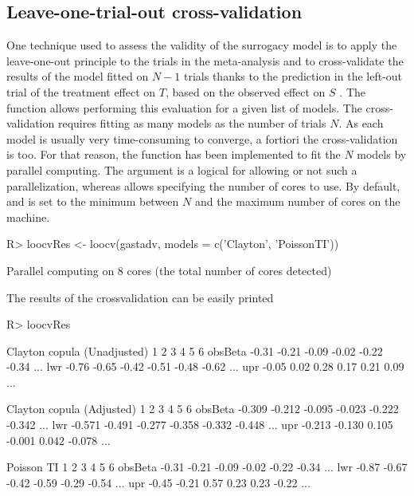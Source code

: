 \documentclass[article,shortnames, nojss]{jss}\usepackage[]{graphicx}\usepackage[]{color}
\begin{document}
\subsection{Leave-one-trial-out cross-validation}
One technique used to assess the validity of the surrogacy model
  is to apply the leave-one-out principle to the trials in the meta-analysis
  and to cross-validate the results of the model fitted on
  $N-1$ trials thanks to the prediction in the left-out trial
  of the treatment effect on $T$, based on the observed effect on $S$
\citep{Michiels09, Mauguen13, Rotolo17}.
The function  allows performing this evaluation for
  a given list of models.
The cross-validation requires fitting as many models as the number of trials $N$.
As each model is usually very time-consuming to converge,
  a fortiori the cross-validation is too.
For that reason, the function  has been implemented to
  fit the $N$ models by parallel computing.
The argument  is a logical for allowing or not such a parallelization,
  whereas  allows specifying the number of cores to use.
By default,  and  is set to the minimum
  between $N$ and the maximum number of cores on the machine.
\begin{Schunk}
\begin{Sinput}
R>   loocvRes <- loocv(gastadv, models = c('Clayton', 'PoissonTI'))
\end{Sinput}
\begin{Soutput}
Parallel computing on 8 cores (the total number of cores detected)
\end{Soutput}
\end{Schunk}
The results of the crossvalidation can be easily printed
\begin{Schunk}
\begin{Sinput}
R>   loocvRes
\end{Sinput}
\begin{Soutput}

   Clayton copula (Unadjusted) 
        1     2     3     4     5     6        
obsBeta -0.31 -0.21 -0.09 -0.02 -0.22 -0.34 ...
lwr     -0.76 -0.65 -0.42 -0.51 -0.48 -0.62 ...
upr     -0.05  0.02  0.28  0.17  0.21  0.09 ...

   Clayton copula (Adjusted) 
        1      2      3      4      5      6         
obsBeta -0.309 -0.212 -0.095 -0.023 -0.222 -0.342 ...
lwr     -0.571 -0.491 -0.277 -0.358 -0.332 -0.448 ...
upr     -0.213 -0.130  0.105 -0.001  0.042 -0.078 ...

   Poisson TI 
        1     2     3     4     5     6        
obsBeta -0.31 -0.21 -0.09 -0.02 -0.22 -0.34 ...
lwr     -0.87 -0.67 -0.42 -0.59 -0.29 -0.54 ...
upr     -0.45 -0.21  0.57  0.23  0.23 -0.22 ...
\end{Soutput}
\end{Schunk}
\end{document}
